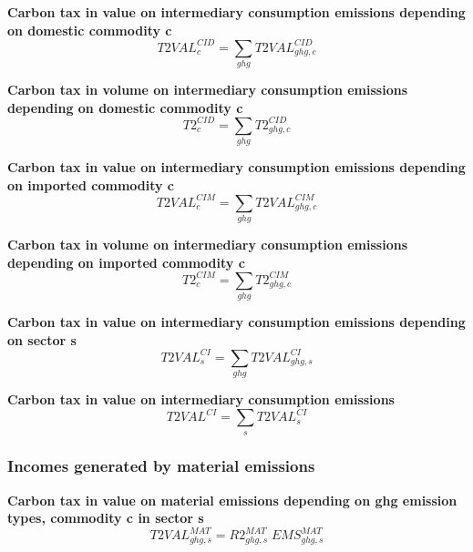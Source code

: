 \documentclass[12pt]{article}
\numberwithin{equation}{section}
\begin{document}
\noindent \textbf{Carbon tax in value on intermediary consumption emissions depending on domestic commodity c} 
\begin{dmath}
T2VAL^{CID}_{c} = \sum_{ghg} T2VAL^{CID}_{ghg, c}
\label{Exception_taxes_prices.mdlT2VAL_CID[c]}
\end{dmath}

\noindent \textbf{Carbon tax in volume on intermediary consumption emissions depending on domestic commodity c} 
\begin{dmath}
T2^{CID}_{c} = \sum_{ghg} T2^{CID}_{ghg, c}
\label{Exception_taxes_prices.mdlT2_CID[c]}
\end{dmath}

\noindent \textbf{Carbon tax in value on intermediary consumption emissions depending on imported commodity c} 
\begin{dmath}
T2VAL^{CIM}_{c} = \sum_{ghg} T2VAL^{CIM}_{ghg, c}
\label{Exception_taxes_prices.mdlT2VAL_CIM[c]}
\end{dmath}

\noindent \textbf{Carbon tax in volume on intermediary consumption emissions depending on imported commodity c} 
\begin{dmath}
T2^{CIM}_{c} = \sum_{ghg} T2^{CIM}_{ghg, c}
\label{Exception_taxes_prices.mdlT2_CIM[c]}
\end{dmath}

\noindent \textbf{Carbon tax in value on intermediary consumption emissions depending on sector s} 
\begin{dmath}
T2VAL^{CI}_{s} = \sum_{ghg} T2VAL^{CI}_{ghg, s}
\label{Exception_taxes_prices.mdlT2VAL_CI[s]}
\end{dmath}

\noindent \textbf{Carbon tax in value on intermediary consumption emissions} 
\begin{dmath}
T2VAL^{CI} = \sum_{s} T2VAL^{CI}_{s}
\label{Exception_taxes_prices.mdlT2VAL_CI}
\end{dmath}



\subsubsection{Incomes generated by material emissions}



\noindent \textbf{Carbon tax in value on material emissions depending on ghg emission types, commodity c in sector s} 
\begin{dmath}
T2VAL^{MAT}_{ghg, s} = R2^{MAT}_{ghg, s} \; EMS^{MAT}_{ghg, s}
\label{Exception_taxes_prices.mdlT2VAL_MAT[ghg,s]}
\end{dmath}
\end{document}
